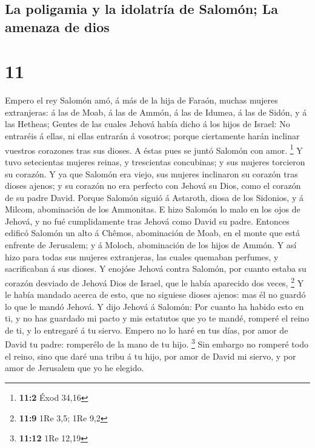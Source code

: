 \hypertarget{la-poligamia-y-la-idolatruxeda-de-salomuxf3n-la-amenaza-de-dios}{%
\subsection{La poligamia y la idolatría de Salomón; La amenaza de
dios}\label{la-poligamia-y-la-idolatruxeda-de-salomuxf3n-la-amenaza-de-dios}}

\hypertarget{section-10}{%
\section{11}\label{section-10}}

 Empero el rey Salomón amó, á más de la hija de Faraón,
muchas mujeres extranjeras: á las de Moab, á las de Ammón, á las de
Idumea, á las de Sidón, y á las Hetheas;  Gentes de las
cuales Jehová había dicho á los hijos de Israel: No entraréis á ellas,
ni ellas entrarán á vosotros; porque ciertamente harán inclinar vuestros
corazones tras sus dioses. A éstas pues se juntó Salomón con amor.
\footnote{\textbf{11:2} Éxod 34,16}  Y tuvo setecientas
mujeres reinas, y trescientas concubinas; y sus mujeres torcieron su
corazón.  Y ya que Salomón era viejo, sus mujeres inclinaron
su corazón tras dioses ajenos; y su corazón no era perfecto con Jehová
su Dios, como el corazón de su padre David.  Porque Salomón
siguió á Astaroth, diosa de los Sidonios, y á Milcom, abominación de los
Ammonitas.  E hizo Salomón lo malo en los ojos de Jehová, y
no fué cumplidamente tras Jehová como David su padre. 
Entonces edificó Salomón un alto á Chêmos, abominación de Moab, en el
monte que está enfrente de Jerusalem; y á Moloch, abominación de los
hijos de Ammón.  Y así hizo para todas sus mujeres
extranjeras, las cuales quemaban perfumes, y sacrificaban á sus dioses.
 Y enojóse Jehová contra Salomón, por cuanto estaba su
corazón desviado de Jehová Dios de Israel, que le había aparecido dos
veces, \footnote{\textbf{11:9} 1Re 3,5; 1Re 9,2}  Y le
había mandado acerca de esto, que no siguiese dioses ajenos: mas él no
guardó lo que le mandó Jehová.  Y dijo Jehová á Salomón:
Por cuanto ha habido esto en ti, y no has guardado mi pacto y mis
estatutos que yo te mandé, romperé el reino de ti, y lo entregaré á tu
siervo.  Empero no lo haré en tus días, por amor de David
tu padre: romperélo de la mano de tu hijo. \footnote{\textbf{11:12} 1Re
  12,19}  Sin embargo no romperé todo el reino, sino que
daré una tribu á tu hijo, por amor de David mi siervo, y por amor de
Jerusalem que yo he elegido.

